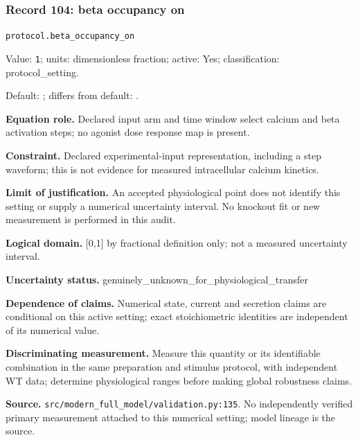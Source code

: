 \subsubsection*{Record 104: beta occupancy on}
{\small \nolinkurl{protocol.beta_occupancy_on}\par

Value: \texttt{1}; units: dimensionless fraction; active: Yes; classification: protocol\_setting.\par

Default: ; differs from default: .\par

\textbf{Equation role.} Declared input arm and time window select calcium and beta activation steps; no agonist dose response map is present.\par

\textbf{Constraint.} Declared experimental-input representation, including a step waveform; this is not evidence for measured intracellular calcium kinetics.\par

\textbf{Limit of justification.} An accepted physiological point does not identify this setting or supply a numerical uncertainty interval. No knockout fit or new measurement is performed in this audit.\par

\textbf{Logical domain.} [0,1] by fractional definition only; not a measured uncertainty interval.\par

\textbf{Uncertainty status.} genuinely\_unknown\_for\_physiological\_transfer\par

\textbf{Dependence of claims.} Numerical state, current and secretion claims are conditional on this active setting; exact stoichiometric identities are independent of its numerical value.\par

\textbf{Discriminating measurement.} Measure this quantity or its identifiable combination in the same preparation and stimulus protocol, with independent WT data; determine physiological ranges before making global robustness claims.\par

\textbf{Source.} \nolinkurl{src/modern_full_model/validation.py:135}. No independently verified primary measurement attached to this numerical setting; model lineage is the source.\par}

